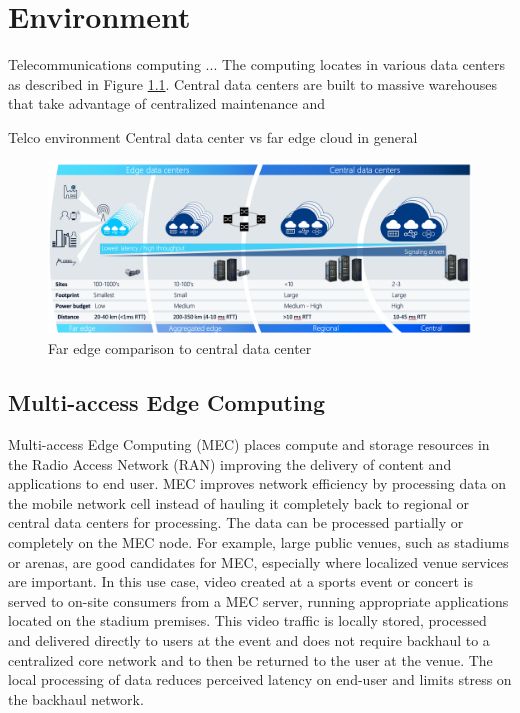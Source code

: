 \chapter{Environment}
\label{chapter:environment}

Telecommunications computing ... The computing locates in various data centers as described in Figure \ref{fig:AirFrame}. Central data centers are built to massive warehouses that take advantage of centralized maintenance and 

Telco environment
Central data center vs far edge cloud in general

\begin{figure}[ht]
  \begin{center}
    \includegraphics[width=13.5cm]{images/AirFrame.png}
    \caption{Far edge comparison to central data center \cite{AirFrameOpenEdgeServer}}
    \label{fig:AirFrame}
  \end{center}
\end{figure}

\section{Multi-access Edge Computing}

Multi-access Edge Computing (MEC) places compute and storage resources in the Radio Access Network (RAN) improving the delivery of content and applications to end user. MEC improves network efficiency by processing data on the mobile network cell instead of hauling it completely back to regional or central data centers for processing. The data can be processed partially or completely on the MEC node. For example, large public venues, such as stadiums or arenas, are good candidates for MEC, especially where localized venue services are important. In this use case, video created at a sports event or concert is served to on-site consumers from a MEC server, running appropriate applications located on the stadium premises. This video traffic is locally stored, processed and delivered directly to users at the event and does not require backhaul to a centralized core network and to then be returned to the user at the venue. The local processing of data reduces perceived latency on end-user and limits stress on the backhaul network. \cite{Brown2016}

